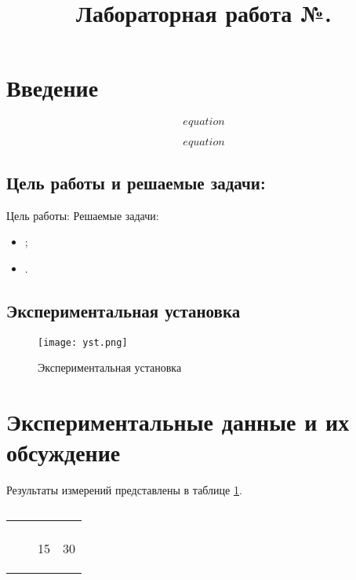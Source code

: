 \documentclass[12pt,a4paper]{article}
\title{Лабораторная работа №.}
\date{}
\begin{document}
	\maketitle
	\thispagestyle{empty}
	\section{Введение}

\begin{equation}
    equation
    \label{key}
\end{equation}

\begin{equation}
    equation
\label{key}
\end{equation}


\subsection{Цель работы и решаемые задачи:}
Цель работы:
Решаемые задачи:
\begin{itemize}	
	\item ;
	\item .
\end{itemize}

\subsection{Экспериментальная установка}

\begin{figure}[h]
	\centering
	\texttt{[image: yst.png]}
	\caption{Экспериментальная установка}	
	\label{im:yst}	
\end{figure}

   
\section{Экспериментальные данные и их обсуждение}
Результаты измерений представлены в таблице \ref{tab:data1}. 
\begin{table}[h]
	\caption{}
	\centering
	\label{tab:data1}
	\begin{tabular}{| c | c | c | c |} \hline
 &  &  &  \\ \hline
 &  &  &  \\ \hline
   &  	&\multirow{10}{*}{15}&\multirow{10}{*}{30} \\  \cline{1-2}
	&  	&	& \\  \cline{1-2}
	&  	&	& \\  \cline{1-2}
	&  	&	& \\  \cline{1-2}
	&  	&	& \\  \cline{1-2}
	&  	&	& \\  \cline{1-2}
	&  	&	& \\  \cline{1-2}
	&  	&	& \\  \cline{1-2}
	&  	&	& \\  \cline{1-2}
	&  	&	& \\ 
		\hline
	\end{tabular}
\end{table}	
\end{document}
